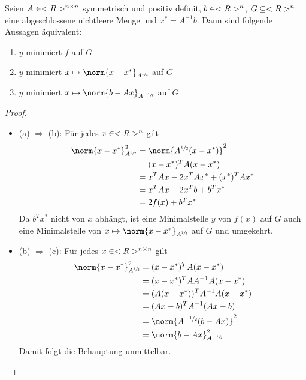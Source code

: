 \begin{lemma}
	Seien $A\in<R>^{n \times n}$ symmetrisch und positiv definit, $b\in<R>^n$, $G\subseteq<R>^n$ eine abgeschlossene nichtleere Menge und $x^\ast=A^{-1}b$. Dann sind folgende Aussagen äquivalent:
	\begin{enumerate}[label=(\alph*)]
		\item $y$ minimiert $f$ auf $G$
		\item $y$ minimiert $x\mapsto\norm{x-x^\ast}_{A^{\sfrac{1}{2}}}$ auf $G$
		\item $y$ minimiert $x\mapsto\norm{b-Ax}_{A^{-\sfrac{1}{2}}}$ auf $G$
	\end{enumerate}
\end{lemma}
\begin{proof}
	\begin{itemize}
		\item (a) $\Rightarrow$ (b): Für jedes $x\in<R>^n$ gilt
		\begin{align}
			\norm{x-x^\ast}^2_{A^{\sfrac{1}{2}}} &= \norm{A^{\sfrac{1}{2}}(x-x^\ast)}^2 \notag \\
			&= (x-x^\ast)^TA(x-x^\ast)\notag \\
			&= x^TAx-2x^TAx^\ast+(x^\ast)^TAx^\ast \notag \\
			&= x^TAx-2x^Tb+b^Tx^\ast\notag \\
			&= 2f(x) + b^Tx^\ast \notag
		\end{align}
		Da $b^Tx^\ast$ nicht von $x$ abhängt, ist eine Minimalstelle $y$ von $f(x)$ auf $G$ auch eine Minimalstelle von $x\mapsto\norm{x-x^\ast}_{A^{\sfrac{1}{2}}}$ auf $G$ und umgekehrt.
		\item (b) $\Rightarrow$ (c): Für jedes $x\in<R>^{n \times n}$ gilt
		\begin{align}
			\norm{x-x^\ast}^2_{A^{\sfrac{1}{2}}} &= (x-x^\ast)^TA(x-x^\ast) \notag \\
			&= (x-x^\ast)^TAA^{-1}A(x-x^\ast) \notag \\
			&= (A(x-x^\ast))^TA^{-1}A(x-x^\ast) \notag \\
			&= (Ax-b)^TA^{-1}(Ax-b) \notag \\
			&= \norm{A^{-\sfrac{1}{2}}(b-Ax)}^2 \notag \\
			&= \norm{b-Ax}_{A^{-\sfrac{1}{2}}}^2 \notag
		\end{align}
		Damit folgt die Behauptung unmittelbar.
	\end{itemize}
\end{proof}

